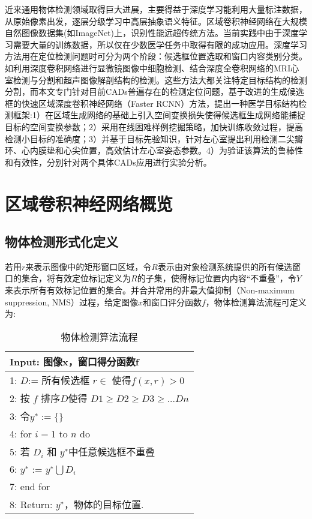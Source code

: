近来通用物体检测领域取得巨大进展，主要得益于深度学习能利用大量标注数据，从原始像素出发，逐层分级学习中高层抽象语义特征\citep{Sharif2014}。区域卷积神经网络\citep{Girshick2014b}在大规模自然图像数据集(如ImageNet\citep{Russakovsky})上，识别性能远超传统方法\citep{Girshick2014b,Krizhevsky2012}。当前实践中由于深度学习需要大量的训练数据，所以仅在少数医学任务中取得有限的成功应用。深度学习方法用在定位检测问题时可分为两个阶段\citep{Girshick2015b}：候选框位置选取和窗口内容类别分类。如利用深度卷积网络进行显微镜图像中细胞检测\citep{Akram2016}、结合深度全卷积网络的MRI心室检测与分割\citep{Emad2015,Tran2016a}和超声图像解剖结构的检测\citep{Chen2016i}。这些方法大都关注特定目标结构的检测分割，而本文专门针对目前CADs普遍存在的检测定位问题，基于改进的生成候选框的快速区域深度卷积神经网络（Faster RCNN）\citep{Ren2015a}方法，提出一种医学目标结构检测框架:1）在区域生成网络的基础上引入空间变换损失使得候选框生成网络能捕捉目标的空间变换参数；2）采用在线困难样例挖掘策略，加快训练收敛过程，提高检测小目标的准确度；3）并基于目标先验知识，针对左心室提出利用检测二尖瓣环、心内膜垫和心尖位置，高效估计左心室姿态参数。4）为验证该算法的鲁棒性和有效性，分别针对两个具体CADs应用进行实验分析。

\section{区域卷积神经网络概览}
 
\subsection{物体检测形式化定义}
若用$r$来表示图像中的矩形窗口区域，令$R$表示由对象检测系统提供的所有候选窗口的集合，将有效定位标记定义为$R$的子集，使得标记位置内内容“不重叠”，令$Y$来表示所有有效标记位置的集合。并合并常用的非最大值抑制（Non-maximum suppression, NMS）过程，给定图像$x$和窗口评分函数$f$，物体检测算法流程可定义为:
\begin{table}[htbp]
 \caption{\label{tab:Algorithm1}物体检测算法流程 }
 \begin{center}
 \begin{tabular}{l}
  \toprule
  Input: 图像x，窗口得分函数f  \\
  \midrule
  1:  $D$:= 所有候选框 $r \in$ 使得$f(x, r) > 0$ \\
  2:  按 $f$ 排序$D$使得 $D1\geq D2 \geq D3 \geq ...Dn$ \\
  3:  令$y^∗:=\{ \}$   \\
  4:  for $i = 1$ to $n$ do \\
  5:     若 $D_{i}$ 和 $y^∗$中任意候选框不重叠 \\
  6:          $y^∗$ := $y^∗  \bigcup {D_{i}}$ \\
  7:  end for \\
  \midrule
  8:  Return:  $y^∗$，物体的目标位置. \\
  \bottomrule 
 \end{tabular}
  \end{center}
\end{table} 
 
